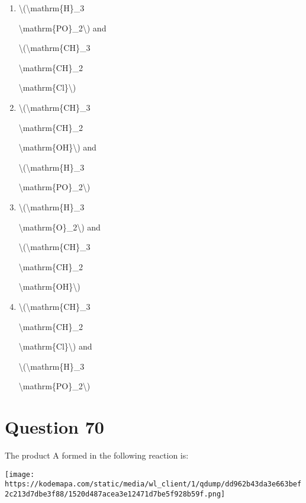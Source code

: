 \documentclass{article}
\begin{document}
\begin{enumerate}[label=(\alph*)]
\item \textbackslash(\textbackslash mathrm\{H\}\_3

\textbackslash mathrm\{PO\}\_2\textbackslash) and

\textbackslash(\textbackslash mathrm\{CH\}\_3

\textbackslash mathrm\{CH\}\_2

\textbackslash mathrm\{Cl\}\textbackslash)


\item \textbackslash(\textbackslash mathrm\{CH\}\_3

\textbackslash mathrm\{CH\}\_2

\textbackslash mathrm\{OH\}\textbackslash) and

\textbackslash(\textbackslash mathrm\{H\}\_3

\textbackslash mathrm\{PO\}\_2\textbackslash)


\item \textbackslash(\textbackslash mathrm\{H\}\_3

\textbackslash mathrm\{O\}\_2\textbackslash) and

\textbackslash(\textbackslash mathrm\{CH\}\_3

\textbackslash mathrm\{CH\}\_2

\textbackslash mathrm\{OH\}\textbackslash)


\item \textbackslash(\textbackslash mathrm\{CH\}\_3

\textbackslash mathrm\{CH\}\_2

\textbackslash mathrm\{Cl\}\textbackslash) and

\textbackslash(\textbackslash mathrm\{H\}\_3

\textbackslash mathrm\{PO\}\_2\textbackslash)


\end{enumerate}
\newpage
\section*{Question 70}
The product A formed in the following reaction is:



\texttt{[image: https://kodemapa.com/static/media/wl\_client/1/qdump/dd962b43da3e663bef2c213d7dbe3f88/1520d487acea3e12471d7be5f928b59f.png]}\\



{}\strut \\
\end{document}
